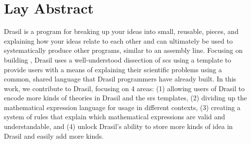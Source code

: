 \chapter{Lay Abstract}
\label{chap:lay_abstract}

Drasil is a program for breaking up your ideas into small, reusable, pieces, and
explaining how your ideas relate to each other and can ultimately be used to
systematically produce other programs, similar to an assembly line. Focusing on
building , Drasil uses a well-understood dissection of \acs{scs} using
a  template to provide users with a means of explaining their
scientific problems using a common, shared language that Drasil programmers have
already built. In this work, we contribute to Drasil, focusing on 4 areas: (1)
allowing users of Drasil to encode more kinds of theories in Drasil and the
\acs{srs} templates, (2) dividing up the mathematical expression language for
usage in different contexts, (3) creating a system of rules that explain which
mathematical expressions are valid and understandable, and (4) unlock Drasil's
ability to store more kinds of idea in Drasil and easily add more kinds.
